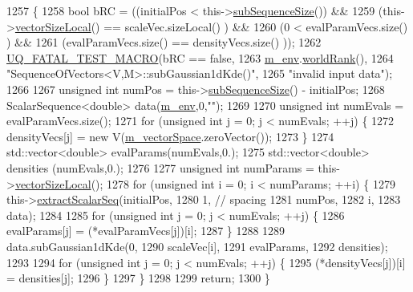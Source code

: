 \begin{DoxyCode}
1257 \{
1258   \textcolor{keywordtype}{bool} bRC = ((initialPos              <  this->\hyperlink{class_q_u_e_s_o_1_1_sequence_of_vectors_a0224bd3e961d86af5d2886301c0c2b86}{subSequenceSize}()) &&
1259               (this->\hyperlink{class_q_u_e_s_o_1_1_base_vector_sequence_a2fefedf9e5b90f22881103b3f92555f6}{vectorSizeLocal}() == scaleVec.sizeLocal()   ) &&
1260               (0                       <  evalParamVecs.size()   ) &&
1261               (evalParamVecs.size()    == densityVecs.size()     ));
1262   \hyperlink{_defines_8h_a56d63d18d0a6d45757de47fcc06f574d}{UQ\_FATAL\_TEST\_MACRO}(bRC == \textcolor{keyword}{false},
1263                       \hyperlink{class_q_u_e_s_o_1_1_base_vector_sequence_a8e8824d2a63c5a43bcc6473e3a0491e8}{m\_env}.\hyperlink{class_q_u_e_s_o_1_1_base_environment_a78b57112bbd0e6dd0e8afec00b40ffa7}{worldRank}(),
1264                       \textcolor{stringliteral}{"SequenceOfVectors<V,M>::subGaussian1dKde()"},
1265                       \textcolor{stringliteral}{"invalid input data"});
1266 
1267   \textcolor{keywordtype}{unsigned} \textcolor{keywordtype}{int} numPos = this->\hyperlink{class_q_u_e_s_o_1_1_sequence_of_vectors_a0224bd3e961d86af5d2886301c0c2b86}{subSequenceSize}() - initialPos;
1268   ScalarSequence<double> data(\hyperlink{class_q_u_e_s_o_1_1_base_vector_sequence_a8e8824d2a63c5a43bcc6473e3a0491e8}{m\_env},0,\textcolor{stringliteral}{""});
1269 
1270   \textcolor{keywordtype}{unsigned} \textcolor{keywordtype}{int} numEvals = evalParamVecs.size();
1271   \textcolor{keywordflow}{for} (\textcolor{keywordtype}{unsigned} \textcolor{keywordtype}{int} j = 0; j < numEvals; ++j) \{
1272     densityVecs[j] = \textcolor{keyword}{new} V(\hyperlink{class_q_u_e_s_o_1_1_base_vector_sequence_a4bd171e39ed050ff105c808336f35198}{m\_vectorSpace}.zeroVector());
1273   \}
1274   std::vector<double> evalParams(numEvals,0.);
1275   std::vector<double> densities  (numEvals,0.);
1276 
1277   \textcolor{keywordtype}{unsigned} \textcolor{keywordtype}{int} numParams = this->\hyperlink{class_q_u_e_s_o_1_1_base_vector_sequence_a2fefedf9e5b90f22881103b3f92555f6}{vectorSizeLocal}();
1278   \textcolor{keywordflow}{for} (\textcolor{keywordtype}{unsigned} \textcolor{keywordtype}{int} i = 0; i < numParams; ++i) \{
1279     this->\hyperlink{class_q_u_e_s_o_1_1_sequence_of_vectors_ac977b3b26a6af2ae727671f1246262fd}{extractScalarSeq}(initialPos,
1280                            1, \textcolor{comment}{// spacing}
1281                            numPos,
1282                            i,
1283                            data);
1284 
1285     \textcolor{keywordflow}{for} (\textcolor{keywordtype}{unsigned} \textcolor{keywordtype}{int} j = 0; j < numEvals; ++j) \{
1286       evalParams[j] = (*evalParamVecs[j])[i];
1287     \}
1288 
1289     data.subGaussian1dKde(0,
1290                           scaleVec[i],
1291                           evalParams,
1292                           densities);
1293 
1294     \textcolor{keywordflow}{for} (\textcolor{keywordtype}{unsigned} \textcolor{keywordtype}{int} j = 0; j < numEvals; ++j) \{
1295       (*densityVecs[j])[i] = densities[j];
1296     \}
1297   \}
1298 
1299   \textcolor{keywordflow}{return};
1300 \}
\end{DoxyCode}
